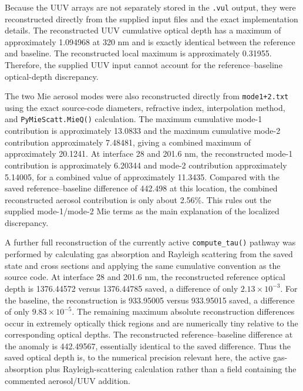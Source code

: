 \documentclass[10pt]{article}
\begin{document}
Because the UUV arrays are not separately stored in the \texttt{.vul} output, they were reconstructed directly from the supplied input files and the exact implementation details. The reconstructed UUV cumulative optical depth has a maximum of approximately 1.094968 at 320 nm and is exactly identical between the reference and baseline. The reconstructed local maximum is approximately 0.31955. Therefore, the supplied UUV input cannot account for the reference--baseline optical-depth discrepancy.

The two Mie aerosol modes were also reconstructed directly from \texttt{mode1+2.txt} using the exact source-code diameters, refractive index, interpolation method, and \texttt{PyMieScatt.MieQ()} calculation. The maximum cumulative mode-1 contribution is approximately 13.0833 and the maximum cumulative mode-2 contribution approximately 7.48481, giving a combined maximum of approximately 20.1241. At interface 28 and 201.6 nm, the reconstructed mode-1 contribution is approximately 6.20344 and mode-2 contribution approximately 5.14005, for a combined value of approximately 11.3435. Compared with the saved reference--baseline difference of 442.498 at this location, the combined reconstructed aerosol contribution is only about 2.56\%. This rules out the supplied mode-1/mode-2 Mie terms as the main explanation of the localized discrepancy.

A further full reconstruction of the currently active \texttt{compute\_tau()} pathway was performed by calculating gas absorption and Rayleigh scattering from the saved state and cross sections and applying the same cumulative convention as the source code. At interface 28 and 201.6 nm, the reconstructed reference optical depth is 1376.44572 versus 1376.44785 saved, a difference of only $2.13\times10^{-3}$. For the baseline, the reconstruction is 933.95005 versus 933.95015 saved, a difference of only $9.83\times10^{-5}$. The remaining maximum absolute reconstruction differences occur in extremely optically thick regions and are numerically tiny relative to the corresponding optical depths. The reconstructed reference--baseline difference at the anomaly is 442.49567, essentially identical to the saved difference. Thus the saved optical depth is, to the numerical precision relevant here, the active gas-absorption plus Rayleigh-scattering calculation rather than a field containing the commented aerosol/UUV addition.
\end{document}
